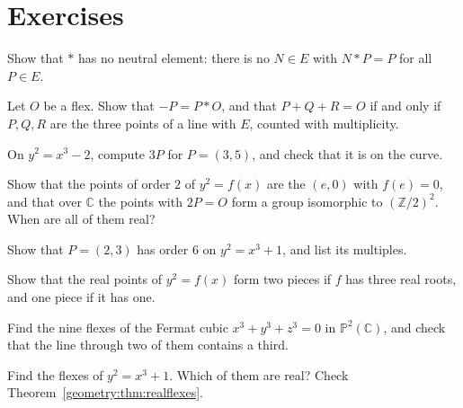 \section{Exercises}

\begin{exercise}[$\star$]\label{geometry:ex:noneutral}
Show that $*$ has no neutral element: there is no $N\in E$ with $N*P=P$ for all $P\in E$.
\end{exercise}

\begin{exercise}[$\star$]\label{geometry:ex:collinear}
Let $O$ be a flex. Show that $-P=P*O$, and that $P+Q+R=O$ if and only if $P,Q,R$ are the three points of a line with $E$, counted with multiplicity.
\end{exercise}

\begin{exercise}[$\star$]\label{geometry:ex:bachet}
On $y^2=x^3-2$, compute $3P$ for $P=(3,5)$, and check that it is on the curve.
\end{exercise}

\begin{exercise}[$\star$]\label{geometry:ex:twotorsion}
Show that the points of order $2$ of $y^2=f(x)$ are the $(e,0)$ with $f(e)=0$, and that over $\mathbb C$ the points with $2P=O$ form a group isomorphic to
$(\mathbb Z/2)^2$. When are all of them real?
\end{exercise}

\begin{exercise}[$\star\star$]\label{geometry:ex:torsionsix}
Show that $P=(2,3)$ has order $6$ on $y^2=x^3+1$, and list its multiples.
\end{exercise}

\begin{exercise}[$\star$]\label{geometry:ex:realcomponents}
Show that the real points of $y^2=f(x)$ form two pieces if $f$ has three real roots, and one piece if it has one.
\end{exercise}

\begin{exercise}[$\star\star$]\label{geometry:ex:fermatflexes}
Find the nine flexes of the Fermat cubic $x^3+y^3+z^3=0$ in $\mathbb P^2(\mathbb C)$, and check that the line through two of them contains a third.
\end{exercise}

\begin{exercise}[$\star\star$]\label{geometry:ex:flexesxcube}
Find the flexes of $y^2=x^3+1$. Which of them are real? Check Theorem~\ref{geometry:thm:realflexes}.
\end{exercise}

